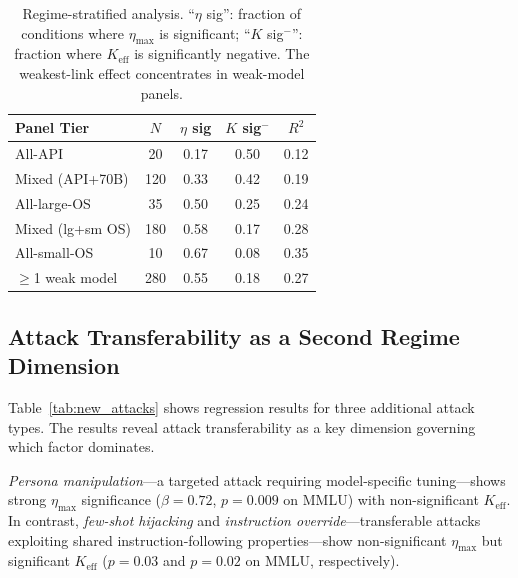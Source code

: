 \documentclass[11pt]{article}
\begin{document}
\begin{table}[t]
\centering
\small
\begin{tabular}{lcccc}
\toprule
\textbf{Panel Tier} & $N$ & $\eta$ sig & $K$ sig$^-$ & $R^2$ \\
\midrule
All-API & 20 & 0.17 & 0.50 & 0.12 \\
Mixed (API+70B) & 120 & 0.33 & 0.42 & 0.19 \\
All-large-OS & 35 & 0.50 & 0.25 & 0.24 \\
Mixed (lg+sm OS) & 180 & 0.58 & 0.17 & 0.28 \\
All-small-OS & 10 & 0.67 & 0.08 & 0.35 \\
$\geq$1 weak model & 280 & 0.55 & 0.18 & 0.27 \\
\bottomrule
\end{tabular}
\caption{Regime-stratified analysis. ``$\eta$ sig'': fraction of conditions where $\eta_{\max}$ is significant; ``$K$ sig$^-$'': fraction where $K_{\text{eff}}$ is significantly negative. The weakest-link effect concentrates in weak-model panels.}
\label{tab:regime_stratified}
\end{table}

\subsection{Attack Transferability as a Second Regime Dimension}
\label{sec:attack_expansion}

Table~\ref{tab:new_attacks} shows regression results for three additional attack types.
The results reveal attack transferability as a key dimension governing which factor dominates.

\emph{Persona manipulation}---a targeted attack requiring model-specific tuning---shows strong $\eta_{\max}$ significance ($\beta = 0.72$, $p = 0.009$ on MMLU) with non-significant $K_{\text{eff}}$.
In contrast, \emph{few-shot hijacking} and \emph{instruction override}---transferable attacks exploiting shared instruction-following properties---show non-significant $\eta_{\max}$ but significant $K_{\text{eff}}$ ($p = 0.03$ and $p = 0.02$ on MMLU, respectively).
\end{document}
